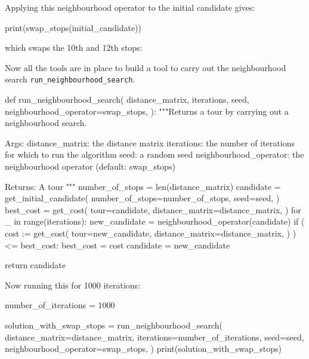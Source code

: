 Applying this neighbourhood operator to the initial candidate gives:

\begin{pyin}
print(swap_stops(initial_candidate))
\end{pyin}

which swaps the 10th and 12th stops:

\begin{pyout}
[0, 7, 12, 5, 11, 3, 9, 2, 8, 1, 4, 10, 6, 0]
\end{pyout}

Now all the tools are in place to build a tool to carry out the
neighbourhood search \texttt{run_neighbourhood_search}.

\begin{pyin}
def run_neighbourhood_search(
    distance_matrix,
    iterations,
    seed,
    neighbourhood_operator=swap_stops,
):
    """Returns a tour by carrying out a neighbourhood search.

    Args:
        distance_matrix: the distance matrix
        iterations: the number of iterations for which to
                    run the algorithm
        seed: a random seed
        neighbourhood_operator: the neighbourhood operator
                                (default: swap_stops)

    Returns:
        A tour
    """
    number_of_stops = len(distance_matrix)
    candidate = get_initial_candidate(
        number_of_stops=number_of_stops,
        seed=seed,
    )
    best_cost = get_cost(
        tour=candidate,
        distance_matrix=distance_matrix,
    )
    for _ in range(iterations):
        new_candidate = neighbourhood_operator(candidate)
        if (
            cost := get_cost(
                tour=new_candidate,
                distance_matrix=distance_matrix,
            )
        ) <= best_cost:
            best_cost = cost
            candidate = new_candidate

    return candidate
\end{pyin}

Now running this for 1000 iterations:

\begin{pyin}
number_of_iterations = 1000

solution_with_swap_stops = run_neighbourhood_search(
    distance_matrix=distance_matrix,
    iterations=number_of_iterations,
    seed=seed,
    neighbourhood_operator=swap_stops,
)
print(solution_with_swap_stops)
\end{pyin}

